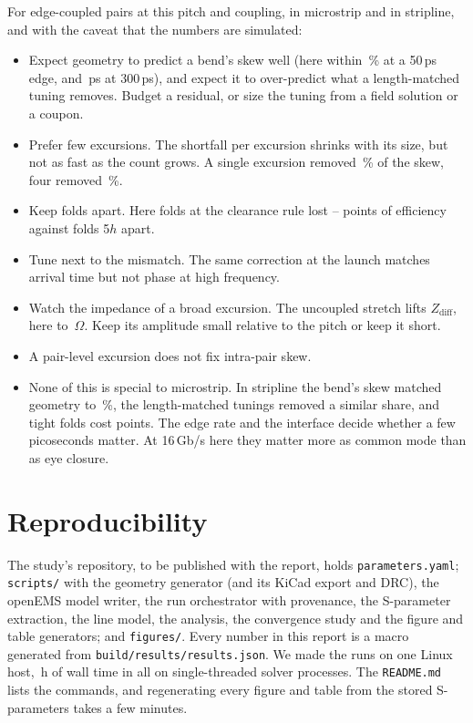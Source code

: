 \documentclass[10pt,twocolumn]{article}
\begin{document}
For edge-coupled pairs at this pitch and coupling, in microstrip and in stripline, and with the caveat that the
numbers are simulated:
\begin{itemize}\itemsep 1pt
\item Expect geometry to predict a bend's skew well (here within \BendErrPct\,\% at a 50\,ps edge, and
\SkewBRdaa\,ps at 300\,ps), and expect it to over-predict what a
length-matched tuning removes. Budget a residual, or size the tuning from a field solution or a coupon.
\item Prefer few excursions. The shortfall per excursion shrinks with its size, but not as fast as the count
grows. A single excursion removed \RemovedPctF\,\% of the skew, four removed \RemovedPctD\,\%.
\item Keep folds apart. Here folds at the clearance rule lost \FoldPenMin--\FoldPenMax{} points of efficiency
against folds
5$h$ apart.
\item Tune next to the mismatch. The same correction at the launch matches arrival time but not phase at high
frequency.
\item Watch the impedance of a broad excursion. The uncoupled stretch lifts $Z_\mathrm{diff}$, here to
\ZmaxF\,$\Omega$. Keep its amplitude small relative to the pitch or keep it short.
\item A pair-level excursion does not fix intra-pair skew.
\item None of this is special to microstrip. In stripline the bend's skew matched geometry to \BendErrPctSl\,\%,
the length-matched tunings removed a similar share, and tight folds cost \FoldPenaltySl{} points. The edge rate and the interface decide whether a few
picoseconds matter. At 16\,Gb/s here they matter more as common mode than as eye closure.
\end{itemize}

\section{Reproducibility}
\label{sec:repro}

The study's repository, to be published with the report, holds \texttt{parameters.yaml}; \texttt{scripts/} with the geometry generator (and its KiCad
export and DRC), the openEMS model writer, the run orchestrator with provenance, the S-parameter extraction, the
line model, the analysis, the convergence study and the figure and table generators; and \texttt{figures/}. Every
number in this report is a macro generated from \texttt{build/results/results.json}. We made the \RunCount{} runs on one
Linux host, \RunHours\,h of wall time in all on single-threaded solver processes. The
\texttt{README.md} lists the commands, and regenerating every figure and table from the stored S-parameters takes a
few minutes.
\end{document}
